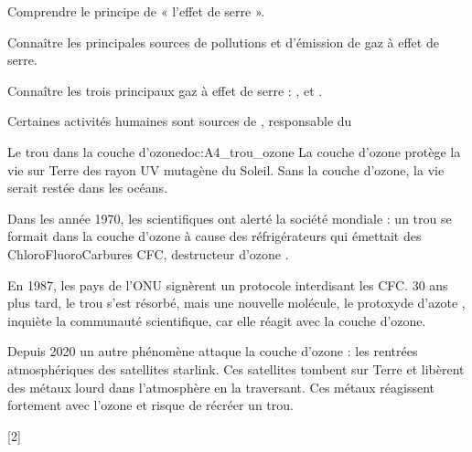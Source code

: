 \teteTermStssEnvi
{}

\begin{objectifs}
  \item Comprendre le principe de « l'effet de serre ».
  \item Connaître les principales sources de pollutions et d'émission de gaz à effet de serre.
  \item Connaître les trois principaux gaz à effet de serre : ,  et .
\end{objectifs}

\begin{contexte}
  Certaines activités humaines sont sources de , responsable du 
  
\end{contexte}

\begin{doc}{Le trou dans la couche d'ozone}{doc:A4_trou_ozone}
  La couche d'ozone protège la vie sur Terre des rayon UV mutagène du Soleil.
  Sans la couche d'ozone, la vie serait restée dans les océans.

  Dans les année 1970, les scientifiques ont alerté la société mondiale : un trou se formait dans la couche d'ozone à cause des réfrigérateurs qui émettait des ChloroFluoroCarbures CFC, destructeur d'ozone .

  En 1987, les pays de l'ONU signèrent un protocole interdisant les CFC.
  30 ans plus tard, le trou s'est résorbé, mais une nouvelle molécule, le protoxyde d'azote , inquiète la communauté scientifique, car elle réagit avec la couche d'ozone.
  
  Depuis 2020 un autre phénomène attaque la couche d'ozone : les rentrées atmosphériques des satellites starlink.
  Ces satellites tombent sur Terre et libèrent des métaux lourd dans l’atmosphère en la traversant. Ces métaux réagissent fortement avec l'ozone et risque de récréer un trou.
\end{doc}

[2]


